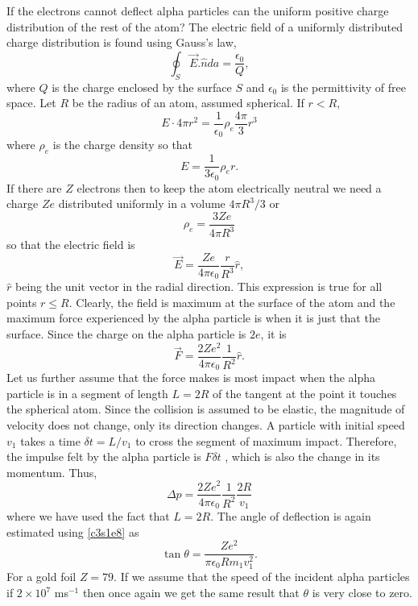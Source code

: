 If the electrons cannot deflect alpha particles can the uniform positive
charge distribution of the rest of the atom? The electric field of a uniformly
distributed charge distribution is found using Gauss's law,
\begin{equation}\label{c3s1e9}
\oint_S \vec{E}.\hat{n}da = \frac{\epsilon_0}{Q},
\end{equation}
where $Q$ is the charge enclosed by the surface $S$ and $\epsilon_0$ is the 
permittivity of free space. Let $R$ be the radius of an atom, assumed spherical.
If $r < R$,
\[
E\cdot 4\pi r^2 = \frac{1}{\epsilon_0} \rho_e \frac{4\pi}{3}r^3
\]
where $\rho_e$ is the charge density so that
\[
E = \frac{1}{3\epsilon_0}\rho_e r.
\]
If there are $Z$ electrons then to keep the atom electrically neutral we need
a charge $Ze$ distributed uniformly in a volume $4\pi R^3/3$ or
\begin{equation}\label{c3s1e10}
\rho_e = \frac{3Ze}{4\pi R^3}
\end{equation}
so that the electric field is
\begin{equation}\label{c3s1e11}
\vec{E} = \frac{Ze}{4\pi\epsilon_0}\frac{r}{R^3}\hat{r},
\end{equation}
$\hat{r}$ being the unit vector in the radial direction. This expression is
true for all points $r \le R$. Clearly, the field is maximum at the surface of
the atom and the maximum force experienced by the alpha particle is when it is
just that the surface. Since the charge on the alpha particle is $2e$, it is
\begin{equation}\label{c3s1e12}
\vec{F} = \frac{2Ze^2}{4\pi\epsilon_0}\frac{1}{R^2}\hat{r}.
\end{equation}
Let us further assume that the force makes is most impact when the alpha 
particle is in a segment of length $L = 2R$ of the tangent at the point it
touches the spherical atom. Since the collision is assumed to be elastic, the
magnitude of velocity does not change, only its direction changes. A particle
with initial speed $v_1$ takes a time $\delta t = L/v_1$ to cross the segment of
maximum impact. Therefore, the impulse felt by the alpha particle is $F\delta t$
, which is also the change in its momentum. Thus,
\begin{equation}\label{c3s1e13}
\Delta p =\frac{2Ze^2}{4\pi\epsilon_0}\frac{1}{R^2}\frac{2R}{v_1}
\end{equation}
where we have used the fact that $L = 2R$. The angle of deflection is again
estimated using \eqref{c3s1e8} as
\begin{equation}\label{c3s1e14}
\tan\theta = \frac{Ze^2}{\pi\epsilon_0 R m_1v_1^2}.
\end{equation}
For a gold foil $Z = 79$. If we assume that the speed of the incident alpha
particles if $2 \times 10^7$ ms${}^{-1}$ then once again we get the same result 
that $\theta$ is very close to zero.


